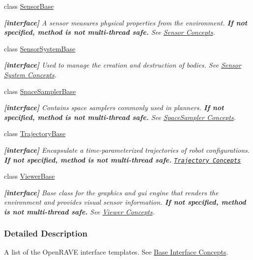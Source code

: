\begin{DoxyCompactItemize}
class \hyperlink{classOpenRAVE_1_1SensorBase}{SensorBase}
\begin{DoxyCompactList}\small\item\em {\bfseries \mbox{[}interface\mbox{]}} A sensor measures physical properties from the environment. {\bfseries If not specified, method is not multi-\/thread safe.} See \hyperlink{arch__sensor}{Sensor Concepts}. \item\end{DoxyCompactList}\item 
class \hyperlink{classOpenRAVE_1_1SensorSystemBase}{SensorSystemBase}
\begin{DoxyCompactList}\small\item\em {\bfseries \mbox{[}interface\mbox{]}} Used to manage the creation and destruction of bodies. See \hyperlink{arch__sensorsystem}{Sensor System Concepts}. \item\end{DoxyCompactList}\item 
class \hyperlink{classOpenRAVE_1_1SpaceSamplerBase}{SpaceSamplerBase}
\begin{DoxyCompactList}\small\item\em {\bfseries \mbox{[}interface\mbox{]}} Contains space samplers commonly used in planners. {\bfseries If not specified, method is not multi-\/thread safe.} See \hyperlink{arch__spacesampler}{SpaceSampler Concepts}. \item\end{DoxyCompactList}\item 
class \hyperlink{classOpenRAVE_1_1TrajectoryBase}{TrajectoryBase}
\begin{DoxyCompactList}\small\item\em {\bfseries \mbox{[}interface\mbox{]}} Encapsulate a time-\/parameterized trajectories of robot configurations. {\bfseries If not specified, method is not multi-\/thread safe.} \href{../main/architecture/trajectory.html}{\tt Trajectory Concepts} \item\end{DoxyCompactList}\item 
class \hyperlink{classOpenRAVE_1_1ViewerBase}{ViewerBase}
\begin{DoxyCompactList}\small\item\em {\bfseries \mbox{[}interface\mbox{]}} Base class for the graphics and gui engine that renders the environment and provides visual sensor information. {\bfseries If not specified, method is not multi-\/thread safe.} See \hyperlink{arch__viewer}{Viewer Concepts}. \item\end{DoxyCompactList}\end{DoxyCompactItemize}


\subsubsection{Detailed Description}
A list of the OpenRAVE interface templates. See \hyperlink{interface__concepts}{Base Interface Concepts}. 